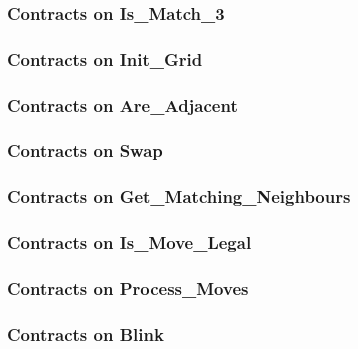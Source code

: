 \subsubsection{Contracts on Is\_Match\_3}


\subsubsection{Contracts on Init\_Grid}


\subsubsection{Contracts on Are\_Adjacent}


\subsubsection{Contracts on Swap}


\subsubsection{Contracts on Get\_Matching\_Neighbours}


\subsubsection{Contracts on Is\_Move\_Legal}


\newpage

\subsubsection{Contracts on Process\_Moves}


\subsubsection{Contracts on Blink}



